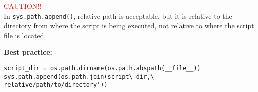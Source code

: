 \begin{mdframed}[backgroundcolor=magenta!10,linecolor=magenta]
    \vspace{6pt}
    \textcolor{red}{CAUTION!!}\\
    \vspace{1pt}
    In \texttt{sys.path.append()}, relative path is acceptable, but it is relative to the directory from where the script is being executed, not relative to where the script file is located.\\

\end{mdframed}
\begin{mdframed}[backgroundcolor=magenta!10,linecolor=magenta]

    \textbf{Best practice:}\\
    \vspace{-16pt}
        \begin{verbatim}
script_dir = os.path.dirname(os.path.abspath(__file__))
sys.path.append(os.path.join(script\_dir,\
relative/path/to/directory'))
        \end{verbatim}
\end{mdframed}

